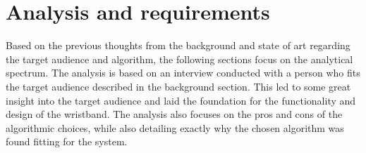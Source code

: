 \section{Analysis and requirements}
Based on the previous thoughts from the background and state of art regarding the target audience and algorithm, the following sections focus on the analytical spectrum. The analysis is based on an interview conducted with a person who fits the target audience described in the background section. This led to some great insight into the target audience and laid the foundation for the functionality and design of the wristband. The analysis also focuses on the pros and cons of the algorithmic choices, while also detailing exactly why the chosen algorithm was found fitting for the system. 




